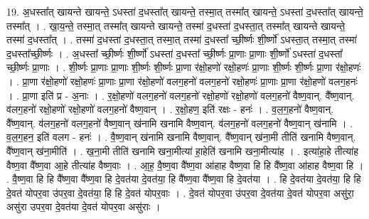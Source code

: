 \documentclass[17pt]{extarticle}
\begin{document}
19. अ॒धस्ता᳚त् खायन्ते खायन्ते॒ ऽधस्ता॑ द॒धस्ता᳚त् खायन्ते॒ तस्मा॒त् तस्मा᳚त् खायन्ते॒ ऽधस्ता॑ द॒धस्ता᳚त् खायन्ते॒ तस्मा᳚त् । . खा॒य॒न्ते॒ तस्मा॒त् तस्मा᳚त् खायन्ते खायन्ते॒ तस्मा॑ द॒धस्ता॑ द॒धस्ता॒त् तस्मा᳚त् खायन्ते खायन्ते॒ तस्मा॑ द॒धस्ता᳚त् । . तस्मा॑ द॒धस्ता॑ द॒धस्ता॒त् तस्मा॒त् तस्मा॑ द॒धस्ता᳚ च्छी॒र्ष्णः शी॒र्ष्णो॑ ऽधस्ता॒त् तस्मा॒त् तस्मा॑ द॒धस्ता᳚च्छी॒र्ष्णः । . अ॒धस्ता᳚ च्छी॒र्ष्णः शी॒र्ष्णो॑ ऽधस्ता॑ द॒धस्ता᳚ च्छी॒र्ष्णः प्रा॒णाः प्रा॒णाः शी॒र्ष्णो॑ ऽधस्ता॑ 
द॒धस्ता᳚ च्छी॒र्ष्णः प्रा॒णाः । . शी॒र्ष्णः प्रा॒णाः प्रा॒णाः शी॒र्ष्णः शी॒र्ष्णः प्रा॒णा र॑क्षो॒हणो॑ रक्षो॒हणः॑ प्रा॒णाः शी॒र्ष्णः शी॒र्ष्णः प्रा॒णा र॑क्षो॒हणः॑ । . प्रा॒णा र॑क्षो॒हणो॑ रक्षो॒हणः॑ प्रा॒णाः प्रा॒णा र॑क्षो॒हणो॑ वलग॒हनो॑ वलग॒हनो॑ रक्षो॒हणः॑ प्रा॒णाः प्रा॒णा र॑क्षो॒हणो॑ वलग॒हनः॑ । . प्रा॒णा इति॑ प्र - अ॒नाः । . र॒क्षो॒हणो॑ वलग॒हनो॑ वलग॒हनो॑ रक्षो॒हणो॑ रक्षो॒हणो॑ वलग॒हनो॑ वैष्ण॒वान्. वै᳚ष्ण॒वान्. व॑लग॒हनो॑ रक्षो॒हणो॑ रक्षो॒हणो॑ वलग॒हनो॑ वैष्ण॒वान् । . र॒क्षो॒हण॒ इति॑ रक्षः - हनः॑ । . व॒ल॒ग॒हनो॑ वैष्ण॒वान्. वै᳚ष्ण॒वान्. व॑लग॒हनो॑ वलग॒हनो॑ वैष्ण॒वान् ख॑नामि खनामि वैष्ण॒वान्. व॑लग॒हनो॑ वलग॒हनो॑ वैष्ण॒वान् ख॑नामि । . व॒ल॒ग॒हन॒ इति॑ वलग - हनः॑ । . वै॒ष्ण॒वान् ख॑नामि खनामि वैष्ण॒वान्. वै᳚ष्ण॒वान् ख॑ना॒मी तीति॑ खनामि वैष्ण॒वान्. वै᳚ष्ण॒वान् ख॑ना॒मीति॑ । . ख॒ना॒मी तीति॑ खनामि खना॒मीत्या॑ हा॒हेति॑ खनामि खना॒मीत्या॑ह । . इत्या॑हा॒हे तीत्या॑ह वैष्ण॒वा वै᳚ष्ण॒वा आ॒हे तीत्या॑ह वैष्ण॒वाः । . आ॒ह॒ वै॒ष्ण॒वा वै᳚ष्ण॒वा आ॑हाह वैष्ण॒वा हि हि वै᳚ष्ण॒वा आ॑हाह वैष्ण॒वा हि । . वै॒ष्ण॒वा हि हि वै᳚ष्ण॒वा वै᳚ष्ण॒वा हि दे॒वत॑या दे॒वत॑या॒ हि वै᳚ष्ण॒वा वै᳚ष्ण॒वा हि दे॒वत॑या । . हि दे॒वत॑या दे॒वत॑या॒ हि हि दे॒वत॑ योपर॒वा उ॑पर॒वा दे॒वत॑या॒ हि हि दे॒वत॑ योपर॒वाः । . दे॒वत॑ योपर॒वा उ॑पर॒वा दे॒वत॑या दे॒वत॑ योपर॒वा असु॑रा॒ असु॑रा उपर॒वा दे॒वत॑या दे॒वत॑
योपर॒वा असु॑राः । \newline
\end{document}
